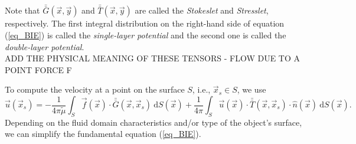 Note that $ \bar{\bar{G}}(\vec{x},\vec{y})$ and $ \bar{\bar{T}}(\vec{x},\vec{y}) $ are called  the {\textit{Stokeslet}} and {\textit{Stresslet}}, respectively.
The first integral distribution on the right-hand side of equation (\ref{eq_BIE}) is called the \textit{single-layer potential} and the second one is called the \textit{double-layer potential}. 
\\
{\color{red} ADD THE PHYSICAL MEANING OF THESE TENSORS - FLOW DUE TO A POINT FORCE F}
\par
To compute the velocity at a point on the surface $S$, i.e., $ \vec{x}_s \in S$, we use 
\begin{equation}
   \vec{u}(\vec{x}_s) = - \frac{1}{4 \pi {\tilde{\mu}}} \int_S  \vec{f}(\vec{x}) \cdot \bar{\bar{G}}(\vec{x},\vec{x}_s) \ \text{d}S(\vec{x}) 
+ \frac{1}{4 \pi} 
\int_S
\vec{u}(\vec{x}) \cdot  \bar{\bar{T}}(\vec{x},\vec{x}_s)  
\cdot \hat{n} ( \vec{x})
\ \text{d}S(\vec{x}).
\label{eq_BIE_onS}
\end{equation}
Depending on the fluid domain characteristics and/or type of the object's surface, we can simplify the fundamental equation (\ref{eq_BIE}).


